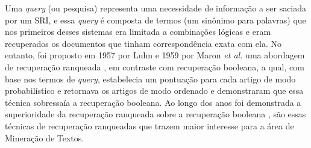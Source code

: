 Uma \textit{query} (ou pesquisa) representa uma necessidade de informação a ser saciada por um SRI, e essa \textit{query} é composta de termos (um sinônimo para palavras) que nos primeiros desses sistemas era limitada a combinações lógicas e eram recuperados os documentos que tinham correspondência exata com ela. 
No entanto, foi proposto em 1957 por Luhn e 1959 por Maron \textit{et al.} uma abordagem de recuperação ranqueada \cite[p.~1446]{Sanderson2012THIRR}, em contraste com recuperação booleana, a qual, com base nos termos de \textit{query}, estabelecia um pontuação para cada artigo de modo probabilístico e retornava os artigos de modo ordenado e demonstraram que essa técnica sobressaía a recuperação booleana. 
Ao longo dos anos foi demonstrada a superioridade da recuperação ranqueada sobre a recuperação booleana \cite{Jones:1981:IRE:539571}, são essas técnicas de recuperação ranqueadas que trazem maior interesse para a área de Mineração de Textos.



